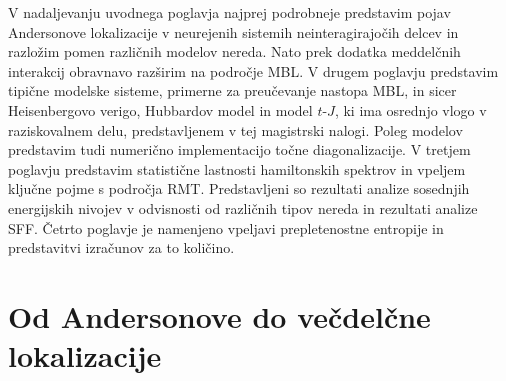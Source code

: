   V nadaljevanju uvodnega poglavja najprej podrobneje predstavim pojav Andersonove lokalizacije v neurejenih sistemih neinteragirajočih delcev in razložim pomen različnih modelov nereda. Nato prek dodatka meddelčnih interakcij obravnavo razširim na področje MBL. V drugem poglavju predstavim tipične modelske sisteme, primerne za preučevanje nastopa MBL, in sicer Heisenbergovo verigo, Hubbardov model in model $t$-$J$, ki ima osrednjo vlogo v raziskovalnem delu, predstavljenem v tej magistrski nalogi. Poleg modelov predstavim tudi numerično implementacijo točne diagonalizacije. V tretjem poglavju predstavim statistične lastnosti hamiltonskih spektrov in vpeljem ključne pojme s področja RMT. Predstavljeni so rezultati analize sosednjih energijskih nivojev v odvisnosti od različnih tipov nereda in rezultati analize SFF. Četrto poglavje je namenjeno vpeljavi prepletenostne entropije in predstavitvi izračunov za to količino. 





%
\chapter{Od Andersonove do večdelčne lokalizacije}
